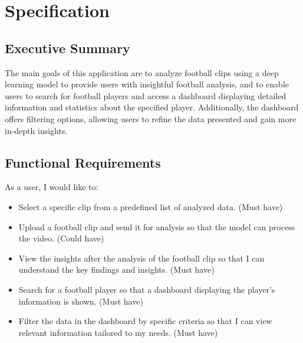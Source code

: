 \documentclass{article}
\begin{document}
\pagebreak
\section{Specification}
\subsection{Executive Summary}
The main goals of this application are to analyze football clips using a deep learning model to provide users with insightful football analysis, and to enable users to search for football players and access a dashboard displaying detailed information and statistics about the specified player. Additionally, the dashboard offers filtering options, allowing users to refine the data presented and gain more in-depth insights.

\subsection{Functional Requirements}
As a user, I would like to:
\begin{itemize}
    \item Select a specific clip from a predefined list of analyzed data. (Must have)
    \item Upload a football clip and send it for analysis so that the model can process the video. (Could have)
    \item View the insights after the analysis of the football clip so that I can understand the key findings and insights. (Must have)
    \item Search for a football player so that a dashboard displaying the player's information is shown. (Must have)
    \item Filter the data in the dashboard by specific criteria so that I can view relevant information tailored to my needs. (Must have)
\end{itemize}
\end{document}
